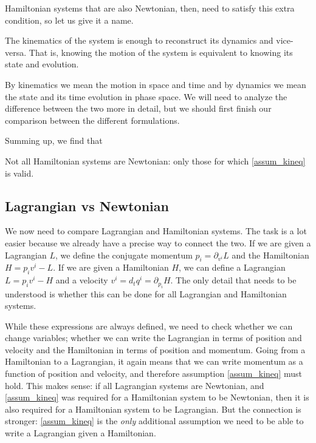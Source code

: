 Hamiltonian systems that are also Newtonian, then, need to satisfy this extra condition, so let us give it a name.
\renewcommand{\theassump}{KE}%
\begin{assump}\label{assum_kineq}
	The kinematics of the system is enough to reconstruct its dynamics and vice-versa. That is, knowing the motion of the system is equivalent to knowing its state and evolution.
\end{assump}
\renewcommand{\theassump}{\Roman{assump}}%
By kinematics we mean the motion in space and time and by dynamics we mean the state and its time evolution in phase space. We will need to analyze the difference between the two more in detail, but we should first finish our comparison between the different formulations.

Summing up, we find that
\begin{insight}
	Not all Hamiltonian systems are Newtonian: only those for which  \ref{assum_kineq} is valid.
\end{insight}

\subsection{Lagrangian vs Newtonian}

We now need to compare Lagrangian and Hamiltonian systems. The task is a lot easier because we already have a precise way to connect the two. If we are given a Lagrangian $L$, we define the conjugate momentum $p_i = \partial_{v^i} L$ and the Hamiltonian $H = p_i v^i - L$. If we are given a Hamiltonian $H$, we can define a Lagrangian $L = p_i v^i - H$ and a velocity $v^i = d_t q^i = \partial_{p_i} H$. The only detail that needs to be understood is whether this can be done for all Lagrangian and Hamiltonian systems.

While these expressions are always defined, we need to check whether we can change variables; whether we can write the Lagrangian in terms of position and velocity and the Hamiltonian in terms of position and momentum. Going from a Hamiltonian to a Lagrangian, it again means that we can write momentum as a function of position and velocity, and therefore assumption \ref{assum_kineq} must hold. This makes sense: if all Lagrangian systems are Newtonian, and \ref{assum_kineq} was required for a Hamiltonian system to be Newtonian, then it is also required for a Hamiltonian system to be Lagrangian. But the connection is stronger: \ref{assum_kineq} is the \emph{only} additional assumption we need to be able to write a Lagrangian given a Hamiltonian.

